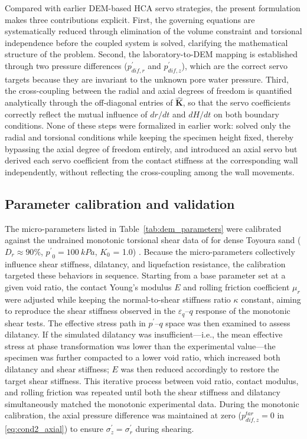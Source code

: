 \documentclass[a4paper,fleqn]{cas-sc}
\newcommand{\Kzero}{\ensuremath{K_0}}
\newcommand{\pmean}{\ensuremath{p^\prime}}
\begin{document}
Compared with earlier DEM-based HCA servo strategies, the present formulation makes three contributions explicit. First, the governing equations are systematically reduced through elimination of the volume constraint and torsional independence before the coupled system is solved, clarifying the mathematical structure of the problem. Second, the laboratory-to-DEM mapping is established through two pressure differences ($p_{dif,r}^{\prime}$ and $p_{dif,z}^{\prime}$), which are the correct servo targets because they are invariant to the unknown pore water pressure. Third, the cross-coupling between the radial and axial degrees of freedom is quantified analytically through the off-diagonal entries of $\hat{\mathbf{K}}$, so that the servo coefficients correctly reflect the mutual influence of $dr/dt$ and $dH/dt$ on both boundary conditions. None of these steps were formalized in earlier work: \citet{Han2024jgs} solved only the radial and torsional conditions while keeping the specimen height fixed, thereby bypassing the axial degree of freedom entirely, and \citet{Ma2024} introduced an axial servo but derived each servo coefficient from the contact stiffness at the corresponding wall independently, without reflecting the cross-coupling among the wall movements.

\subsection{Parameter calibration and validation}
\label{subsec:calibration_validation}

The micro-parameters listed in Table~\ref{tab:dem_parameters} were calibrated against the undrained monotonic torsional shear data of \citet{Nakata1998} for dense Toyoura sand ($D_r \approx 90\%$, $\pmean_0=\SI{100}{kPa}$, \Kzero{} = 1.0) \citep[see also][]{Ma2024}. Because the micro-parameters collectively influence shear stiffness, dilatancy, and liquefaction resistance, the calibration targeted these behaviors in sequence. Starting from a base parameter set at a given void ratio, the contact Young's modulus $E$ and rolling friction coefficient $\mu_r$ were adjusted while keeping the normal-to-shear stiffness ratio $\kappa$ constant, aiming to reproduce the shear stiffness observed in the $\varepsilon_q$--$q$ response of the monotonic shear tests. The effective stress path in $\pmean$--$q$ space was then examined to assess dilatancy. If the simulated dilatancy was insufficient---i.e., the mean effective stress at phase transformation was lower than the experimental value---the specimen was further compacted to a lower void ratio, which increased both dilatancy and shear stiffness; $E$ was then reduced accordingly to restore the target shear stiffness. This iterative process between void ratio, contact modulus, and rolling friction was repeated until both the shear stiffness and dilatancy simultaneously matched the monotonic experimental data. During the monotonic calibration, the axial pressure difference was maintained at zero ($p_{dif,z}^{tar}=0$ in \cref{eq:cond2_axial}) to ensure $\sigma_z^{\prime}=\sigma_r^{\prime}$ during shearing.
\end{document}
